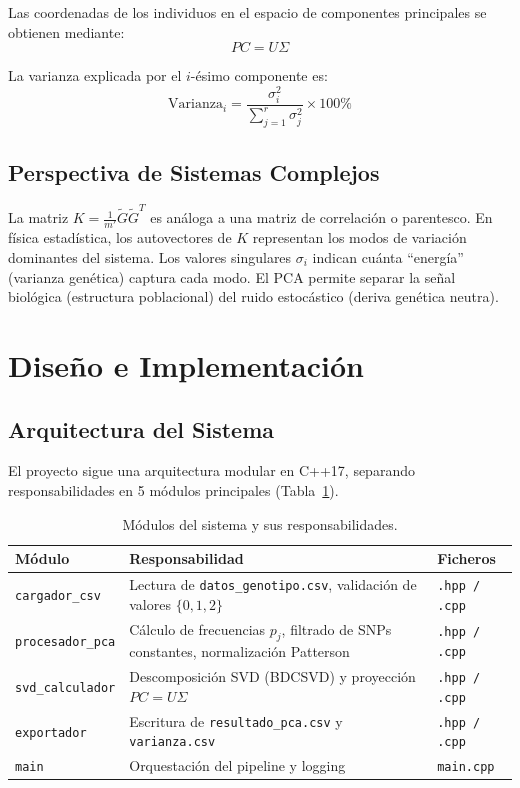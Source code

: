 \documentclass[12pt,a4paper]{article}
\theoremstyle{definition}
\begin{document}
Las coordenadas de los individuos en el espacio de componentes principales se obtienen mediante:
\begin{equation}\label{eq:pc}
PC = U \Sigma
\end{equation}

La varianza explicada por el $i$-\'{e}simo componente es:
\begin{equation}\label{eq:varianza}
\text{Varianza}_i = \frac{\sigma_i^2}{\sum_{j=1}^{r} \sigma_j^2} \times 100\%
\end{equation}

\subsection{Perspectiva de Sistemas Complejos}

La matriz $K = \frac{1}{m'}\tilde{G}\tilde{G}^T$ es an\'{a}loga a una matriz de correlaci\'{o}n o parentesco. En f\'{i}sica estad\'{i}stica, los autovectores de $K$ representan los modos de variaci\'{o}n dominantes del sistema. Los valores singulares $\sigma_i$ indican cu\'{a}nta ``energ\'{i}a'' (varianza gen\'{e}tica) captura cada modo. El PCA permite separar la se\~{n}al biol\'{o}gica (estructura poblacional) del ruido estoc\'{a}stico (deriva gen\'{e}tica neutra).

\section{Dise\~{n}o e Implementaci\'{o}n}\label{sec:implementacion}

\subsection{Arquitectura del Sistema}

El proyecto sigue una arquitectura modular en C++17, separando responsabilidades en 5 m\'{o}dulos principales (Tabla~\ref{tab:modulos}).

\begin{table}[H]
\centering
\caption{M\'{o}dulos del sistema y sus responsabilidades.}
\label{tab:modulos}
\begin{tabular}{@{}lp{6cm}l@{}}
\toprule
\textbf{M\'{o}dulo} & \textbf{Responsabilidad} & \textbf{Ficheros} \\
\midrule
\texttt{cargador\_csv} & Lectura de \texttt{datos\_genotipo.csv}, validaci\'{o}n de valores $\{0,1,2\}$ & \texttt{.hpp / .cpp} \\
\texttt{procesador\_pca} & C\'{a}lculo de frecuencias $p_j$, filtrado de SNPs constantes, normalizaci\'{o}n Patterson & \texttt{.hpp / .cpp} \\
\texttt{svd\_calculador} & Descomposici\'{o}n SVD (BDCSVD) y proyecci\'{o}n $PC = U\Sigma$ & \texttt{.hpp / .cpp} \\
\texttt{exportador} & Escritura de \texttt{resultado\_pca.csv} y \texttt{varianza.csv} & \texttt{.hpp / .cpp} \\
\texttt{main} & Orquestaci\'{o}n del pipeline y logging & \texttt{main.cpp} \\
\bottomrule
\end{tabular}
\end{table}
\end{document}
